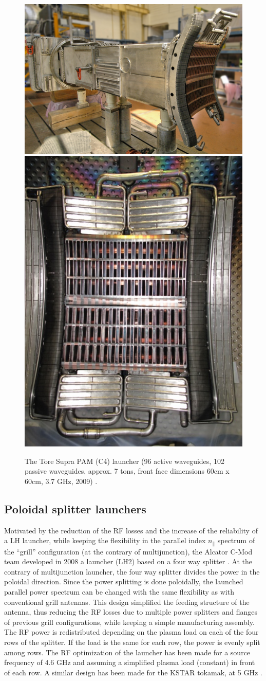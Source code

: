 \begin{figure}
\centering
\includegraphics[width=0.6\linewidth]{Figures/LHCD/dsc_6078_dxo_2}
\includegraphics[width=0.3\linewidth]{Figures/LHCD/ToreSupra_C4}
\caption{The Tore Supra PAM (C4) launcher (96 active waveguides, 102 passive waveguides, approx. 7 tons, front face dimensions 60cm x 60cm, 3.7 GHz, 2009) \parencite{Guilhem2009, Guilhem2011}.}
\label{fig:toresupraC4}
\end{figure}


\subsection{Poloidal splitter launchers}
Motivated by the reduction of the RF losses and the increase of the reliability of a LH launcher, while keeping the flexibility in the parallel index $n_{\parallel}$ spectrum of the “grill” configuration (at the contrary of multijunction), the Alcator C-Mod team developed in 2008 a launcher (LH2) based on a four way splitter \parencite{Koert2008a}. At the contrary of multijunction launcher, the four way splitter divides the power in the poloidal direction. Since the power splitting is done poloidally, the launched parallel power spectrum can be changed with the same flexibility as with conventional grill antennas. This design simplified the feeding structure of the antenna, thus reducing the RF losses due to multiple power splitters and flanges of previous grill configurations, while keeping a simple manufacturing assembly. The RF power is redistributed depending on the plasma load on each of the four rows of the splitter. If the load is the same for each row, the power is evenly split among rows. The RF optimization of the launcher has been made for a source frequency of 4.6 GHz and assuming a simplified plasma load (constant) in front of each row. A similar design has been made for the KSTAR tokamak, at 5 GHz \parencite{Kim2012}. 


